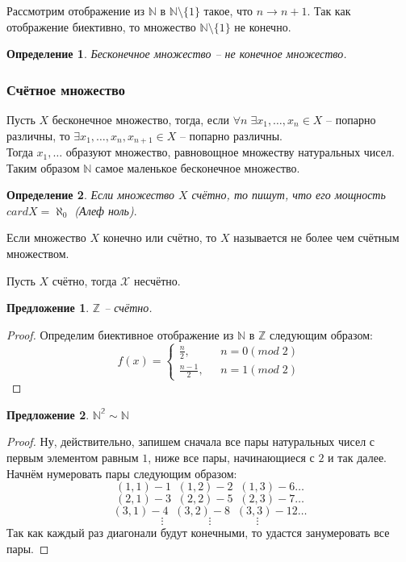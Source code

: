 \documentclass{article}
\newtheorem{Proposition}{Предложение}[section]
\newtheorem{Definition}{Определение}[section]
\begin{document}
Рассмотрим отображение из $\mathbb{N}$ в $\mathbb{N}\setminus\{1\}$ такое, что $n \rightarrow n+1.$ Так как отображение биективно, то множество $\mathbb{N}\setminus\{1\}$ не конечно.
\begin{Definition}
Бесконечное множество -- не конечное множество.
\end{Definition}

\subsubsection{Счётное множество}
Пусть $X$ бесконечное множество, тогда, если $\forall n \; \exists x_1,\ldots, x_n \in X$ -- попарно различны, то $\exists x_1,\ldots, x_n, x_{n+1} \in X$ -- попарно различны.\\

Тогда $x_1,\ldots$ образуют множество, равновощное множеству натуральных чисел. Таким образом $\mathbb{N}$ самое маленькое бесконечное множество.

\begin{Definition}
Если множество $X$ счётно, то пишут, что его мощность $cardX=\aleph_0$ (\textit{Алеф ноль})$.$
\end{Definition}

Если множество $X$ конечно или счётно, то $X$ называется не более чем счётным множеством.

Пусть $X$ счётно, тогда $\mathcal{X}$ несчётно.\\

\begin{Proposition}
$\mathbb{Z}$ -- счётно.
\end{Proposition}
\begin{proof}
Определим биективное отображение из $\mathbb{N}$ в $\mathbb{Z}$ следующим образом: 
\begin{equation*}
f(x) = 
 \begin{cases}
   \frac{n}{2}, &\text{ $n = 0(mod \; 2) $}\\
   \frac{n-1}{2}, &\text{ $n = 1(mod \; 2)$}
 \end{cases}
\end{equation*}
\end{proof}

\begin{Proposition}
$\mathbb{N^2}\sim\mathbb{N}$ 
\end{Proposition}
\begin{proof}
Ну, действительно, запишем сначала все пары натуральных чисел с первым элементом равным $1$, ниже все пары, начинающиеся с $2$ и так далее. Начнём нумеровать пары следующим образом:
$$(1,1) - 1 \;\; (1,2) - 2 \;\; (1,3) - 6 \ldots$$
$$(2,1) - 3 \;\; (2,2) - 5 \;\; (2,3) - 7 \ldots$$
$$(3,1) - 4 \;\; (3,2) - 8 \;\; (3,3) - 12 \ldots$$
$$\vdots \quad\quad\quad\quad\vdots \quad\quad\quad\quad\vdots$$
Так как каждый раз диагонали будут конечными, то удастся занумеровать все пары.
\end{proof}
\end{document}
